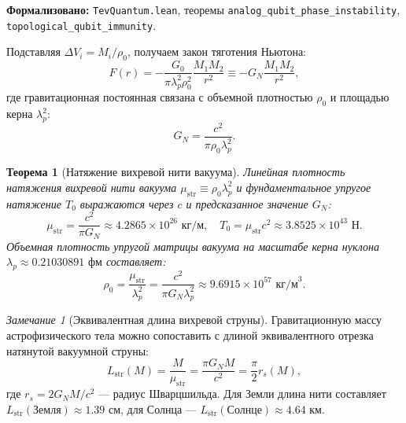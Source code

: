\documentclass[11pt,a4paper]{article}
\newtheorem{theorem}{Теорема}
\theoremstyle{definition}
\theoremstyle{remark}
\newtheorem{remark}{Замечание}
\begin{document}
\noindent\small\textbf{Формализовано:} \texttt{TevQuantum.lean}, теоремы \texttt{analog_qubit_phase_instability}, \texttt{topological_qubit_immunity}.

Подставляя $\Delta V_i = M_i / \rho_0$, получаем закон тяготения Ньютона:
\begin{equation}
	F(r) = -\frac{G_0}{\pi \lambda_p^2 \rho_0^2} \frac{M_1 M_2}{r^2} \equiv -G_N \frac{M_1 M_2}{r^2},
\label{eq:newton_law_exact}
\end{equation}
где гравитационная постоянная связана с объемной плотностью $\rho_0$ и площадью керна $\lambda_p^2$:
\begin{equation}
	G_N = \frac{c^2}{\pi \rho_0 \lambda_p^2}.
\label{eq:GN_density_exact_rel}
\end{equation}

\begin{theorem}[Натяжение вихревой нити вакуума]
\label{thm:planck_string_tension}
Линейная плотность натяжения вихревой нити вакуума $\mu_{\mathrm{str}} \equiv \rho_0 \lambda_p^2$ и фундаментальное упругое натяжение $T_0$ выражаются через $c$ и предсказанное значение $G_N$:
\begin{equation}
	\mu_{\mathrm{str}} = \frac{c^2}{\pi G_N} \approx 4.2865 \times 10^{26}\text{ кг/м}, \quad T_0 = \mu_{\mathrm{str}} c^2 \approx 3.8525 \times 10^{43}\text{ Н}.
\label{eq:mu_str_and_T0_vals}
\end{equation}
Объемная плотность упругой матрицы вакуума на масштабе керна нуклона $\lambda_p \approx 0.21030891\text{ фм}$ составляет:
\begin{equation}
	\rho_0 = \frac{\mu_{\mathrm{str}}}{\lambda_p^2} = \frac{c^2}{\pi G_N \lambda_p^2} \approx 9.6915 \times 10^{57}\text{ кг/м}^3.
\label{eq:rho_0_exact_num}
\end{equation}
\end{theorem}

\begin{remark}[Эквивалентная длина вихревой струны]
Гравитационную массу астрофизического тела можно сопоставить с длиной эквивалентного отрезка натянутой вакуумной струны:
\begin{equation}
	L_{\mathrm{str}}(M) = \frac{M}{\mu_{\mathrm{str}}} = \frac{\pi G_N M}{c^2} = \frac{\pi}{2} r_s(M),
	\label{eq:string_equivalent_length}
\end{equation}
где $r_s = 2 G_N M / c^2$ — радиус Шварцшильда. Для Земли длина нити составляет $L_{\mathrm{str}}(\text{Земля}) \approx 1.39\text{ см}$, для Солнца — $L_{\mathrm{str}}(\text{Солнце}) \approx 4.64\text{ км}$.
\end{remark}
\end{document}
